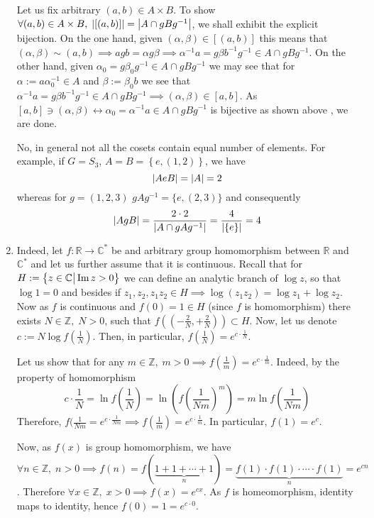\documentclass[8pt]{article} %
\begin{document}
\begin{enumerate}[label=\bfseries Problem \arabic*.]
{\begin{enumerate}[label=(\arabic*)]
{				Let us fix arbitrary $(a,b)\in A\times B$. To show 
				$\forall (a,b)\in A\times B,\;\left|[(a,b)]\right|=\left|A\cap gBg^{-1}\right|$, we shall exhibit the explicit bijection.
				On the one hand, given
				$(\alpha,\beta)\in[(a,b)]$ this means that $(\alpha,\beta)\sim(a,b)\implies agb=\alpha g\beta\implies
				\alpha^{-1}a=g\beta b^{-1}g^{-1}\in A\cap gBg^{-1}$. On the other hand, given $\alpha_0=g\beta_0 g^{-1}\in A\cap
				gBg^{-1}$ we may see that for $\alpha:=a\alpha_0^{-1}\in A$ and $\beta:=\beta_0 b$ we see that
				$\alpha^{-1}a=g\beta b^{-1}g^{-1}\in A\cap gBg^{-1}\implies (\alpha,\beta)\in[a,b]$. As 
				$[a,b]\ni(\alpha,\beta)\leftrightarrow \alpha_0=\alpha^{-1}a\in A\cap gBg^{-1}$ is bijective as shown above
				, we are done.

				No, in general not all the cosets contain equal number of elements. For example, if $G=S_3$, $A=B=\left\{
				e,(1,2)\right\}$, we have
				\[\left|AeB\right|=\left|A\right|=2\]
				whereas for $g=(1,2,3)$ $gAg^{-1}=\{e,(2,3)\}$ and consequently
				\[\left|AgB\right|=\frac{2\cdot 2}{\left|A\cap gAg^{-1}\right|}=\frac{4}{\left|\{e\}\right|}=4\]
				}
			\end{enumerate}
			}
		
	\item{Indeed, let $f:\mathbb{R}\to\mathbb{C}^*$ be and arbitrary group homomorphism between $\mathbb{R}$ and $\mathbb{C}^*$
		and let us further assume that it is continuous.
		Recall that for $H:=\left\{z\in\mathbb{C}\big| \operatorname{Im} z>0\right\}$ we can define an analytic branch of $\log z$, so that $\log 1=0$ and besides
		if $z_1,z_2,z_1z_2\in H\implies \log(z_1z_2)=\log z_1+\log z_2$. Now as $f$ is continuous and $f(0)=1\in H$
		(since $f$ is homomorphism) there exists $N\in
		\mathbb{Z},\;N>0
		$, such that $f((-\frac{2}{N},+\frac{2}{N}))\subset H$. Now, let us denote $c:=N\log f(\frac{1}{N})$. Then, in particular,
		$f(\frac{1}{N})=e^{c\cdot\frac{1}{N} }$.
		
		Let us show that for any $m\in\mathbb{Z},\;m>0\implies f(\frac{1}{m})=e^{c\cdot\frac{1}{m}}$. Indeed, by the property of homomorphism
		\[c\cdot\frac{1}{N}=\ln f(\frac{1}{N})=\ln(f(\frac{1}{Nm})^m)=m\ln f(\frac{1}{Nm})\]
		Therefore, $f(\frac{1}{Nm}=e^{c\cdot\frac{1}{Nm}}\implies f(\frac{1}{m})=e^{c\cdot\frac{1}{m}}$. In particular, $f(1)=e^c$.


		Now, as $f(x)$ is group homomorphism, we have $\forall n\in\mathbb{Z},\;n>0\implies
		f(n)=f\left(\underbrace{1+1+\cdots+1}_{n}\right)=\underbrace{f(1)\cdot f(1)\cdot\dotsm\cdot f(1)}_{n}=e^{cn}$.
		Therefore $\forall x\in\mathbb{Z},\;x>0\implies f(x)=e^{cx}$. As $f$ is homeomorphism, identity
		maps to identity, hence $f(0)=1=e^{c\cdot 0}$.

}
\end{enumerate}
\end{document}
